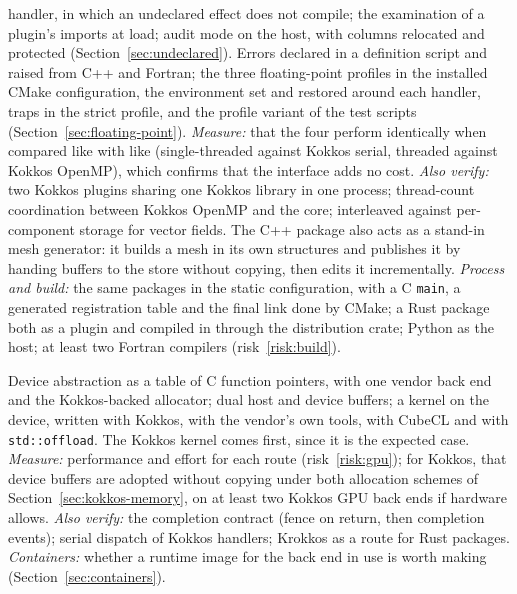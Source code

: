 \documentclass[11pt,a4paper]{article}
\newcommand{\code}[1]{\texttt{#1}}
\begin{document}
\begin{description}[style=nextline,leftmargin=2em]
        handler, in which an undeclared effect does not compile; the
        examination of a plugin's imports at load; audit mode on the host,
        with columns relocated and protected
        (Section~\ref{sec:undeclared}).  Errors declared in a definition script and raised from
        C++ and Fortran; the three floating-point profiles in the installed
        CMake configuration, the environment set and restored around each
        handler, traps in the strict profile, and the profile variant of
        the test scripts (Section~\ref{sec:floating-point}).
        \emph{Measure:} that the four perform identically when compared like
        with like (single-threaded against Kokkos serial, threaded against
        Kokkos OpenMP), which confirms that the interface adds no cost.
        \emph{Also verify:} two Kokkos plugins sharing one Kokkos library in
        one process; thread-count coordination between Kokkos OpenMP and the
        core; interleaved against per-component storage for vector fields.  The C++
        package also acts as a stand-in mesh generator: it builds a mesh in
        its own structures and publishes it by handing buffers to the store
        without copying, then edits it incrementally.
        \emph{Process and build:} the same packages in the static
        configuration, with a C \code{main}, a generated registration table
        and the final link done by CMake; a Rust package both as a plugin and
        compiled in through the distribution crate; Python as the host; at
        least two Fortran compilers (risk~\ref{risk:build}).
  \item[M5. Device memory.]
        Device abstraction as a table of C function pointers, with one
        vendor back end and the Kokkos-backed allocator; dual host and device
        buffers; a kernel on the device, written with Kokkos, with the
        vendor's own tools, with CubeCL and with \code{std::offload}.  The
        Kokkos kernel comes first, since it is the expected case.
        \emph{Measure:} performance and effort for each route (risk~\ref{risk:gpu}); for
        Kokkos, that device buffers are adopted without copying under both
        allocation schemes of Section~\ref{sec:kokkos-memory}, on at least
        two Kokkos GPU back ends if hardware allows.
        \emph{Also verify:} the completion contract (fence on return, then
        completion events); serial dispatch of Kokkos handlers; Krokkos as a
        route for Rust packages.
        \emph{Containers:} whether a runtime image for the back end in use
        is worth making (Section~\ref{sec:containers}).

\end{description}
\end{document}
